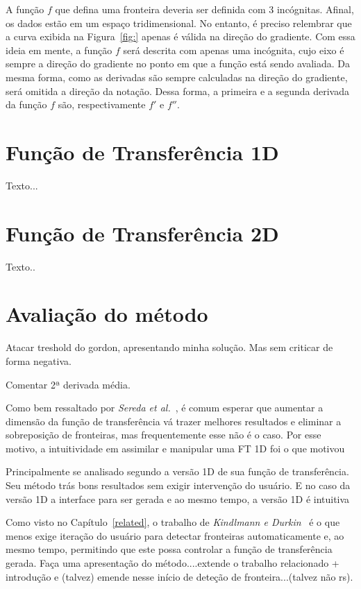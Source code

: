 	A função $f$ que defina uma fronteira deveria ser definida com 3 incógnitas. Afinal, os dados estão em um espaço tridimensional. No entanto, é preciso relembrar que a curva exibida na Figura~\ref{fig:} apenas é válida na direção do gradiente. Com essa ideia em mente, a função $f$ será descrita com apenas uma incógnita, cujo eixo é sempre a direção do gradiente no ponto em que a função está sendo avaliada. Da mesma forma, como as derivadas são sempre calculadas na direção do gradiente, será omitida a direção da notação. Dessa forma, a primeira e a segunda derivada da função $f$ são, respectivamente $f'$ e $f''$.
    
\section{Função de Transferência 1D}
\label{gordon.1d}
	Texto...
    
\section{Função de Transferência 2D}
\label{gordon.2d}    
    Texto..
    
\section{Avaliação do método}
\label{gordon.aval}    
    Atacar treshold do gordon, apresentando minha solução. Mas sem criticar de forma negativa.
    
    Comentar 2ª derivada média.
    
    Como bem ressaltado por \textit{Sereda et al.}~\cite{sereda1}, é comum esperar que aumentar a dimensão da função de transferência vá trazer melhores resultados e eliminar a sobreposição de fronteiras, mas frequentemente esse não é o caso. Por esse motivo, a intuitividade em assimilar e manipular uma FT 1D foi o que motivou
    
    
    Principalmente se analisado segundo a versão 1D de sua função de transferência. Seu método trás bons resultados sem exigir intervenção do usuário. E no caso da versão 1D a interface para ser gerada e ao mesmo tempo, a versão 1D é intuitiva
    
    
    Como visto no Capítulo~\ref{related}, o trabalho de \textit{Kindlmann e Durkin}~\cite{gordon} é o que menos exige iteração do usuário para detectar fronteiras automaticamente e, ao mesmo tempo, permitindo que este possa controlar a função de transferência gerada.
    Faça uma apresentação do método....extende o trabalho relacionado + introdução e (talvez) emende nesse início de deteção de fronteira...(talvez não rs).